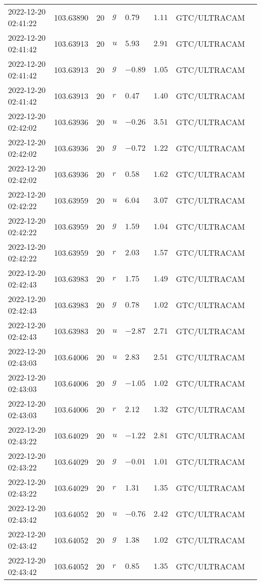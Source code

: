 \documentclass{nature_plusfigure}
\begin{document}
\begin{supplement}
\begin{center}
\begin{longtable}{llllllll}
2022-12-20 02:41:22 & 103.63890 & 20 & $g$ & $0.79$ & $1.11$ & GTC/ULTRACAM &  \\ 
2022-12-20 02:41:42 & 103.63913 & 20 & $u$ & $5.93$ & $2.91$ & GTC/ULTRACAM &  \\ 
2022-12-20 02:41:42 & 103.63913 & 20 & $g$ & $-0.89$ & $1.05$ & GTC/ULTRACAM &  \\ 
2022-12-20 02:41:42 & 103.63913 & 20 & $r$ & $0.47$ & $1.40$ & GTC/ULTRACAM &  \\ 
2022-12-20 02:42:02 & 103.63936 & 20 & $u$ & $-0.26$ & $3.51$ & GTC/ULTRACAM &  \\ 
2022-12-20 02:42:02 & 103.63936 & 20 & $g$ & $-0.72$ & $1.22$ & GTC/ULTRACAM &  \\ 
2022-12-20 02:42:02 & 103.63936 & 20 & $r$ & $0.58$ & $1.62$ & GTC/ULTRACAM &  \\ 
2022-12-20 02:42:22 & 103.63959 & 20 & $u$ & $6.04$ & $3.07$ & GTC/ULTRACAM &  \\ 
2022-12-20 02:42:22 & 103.63959 & 20 & $g$ & $1.59$ & $1.04$ & GTC/ULTRACAM &  \\ 
2022-12-20 02:42:22 & 103.63959 & 20 & $r$ & $2.03$ & $1.57$ & GTC/ULTRACAM &  \\ 
2022-12-20 02:42:43 & 103.63983 & 20 & $r$ & $1.75$ & $1.49$ & GTC/ULTRACAM &  \\ 
2022-12-20 02:42:43 & 103.63983 & 20 & $g$ & $0.78$ & $1.02$ & GTC/ULTRACAM &  \\ 
2022-12-20 02:42:43 & 103.63983 & 20 & $u$ & $-2.87$ & $2.71$ & GTC/ULTRACAM &  \\ 
2022-12-20 02:43:03 & 103.64006 & 20 & $u$ & $2.83$ & $2.51$ & GTC/ULTRACAM &  \\ 
2022-12-20 02:43:03 & 103.64006 & 20 & $g$ & $-1.05$ & $1.02$ & GTC/ULTRACAM &  \\ 
2022-12-20 02:43:03 & 103.64006 & 20 & $r$ & $2.12$ & $1.32$ & GTC/ULTRACAM &  \\ 
2022-12-20 02:43:22 & 103.64029 & 20 & $u$ & $-1.22$ & $2.81$ & GTC/ULTRACAM &  \\ 
2022-12-20 02:43:22 & 103.64029 & 20 & $g$ & $-0.01$ & $1.01$ & GTC/ULTRACAM &  \\ 
2022-12-20 02:43:22 & 103.64029 & 20 & $r$ & $1.31$ & $1.35$ & GTC/ULTRACAM &  \\ 
2022-12-20 02:43:42 & 103.64052 & 20 & $u$ & $-0.76$ & $2.42$ & GTC/ULTRACAM &  \\ 
2022-12-20 02:43:42 & 103.64052 & 20 & $g$ & $1.38$ & $1.02$ & GTC/ULTRACAM &  \\ 
2022-12-20 02:43:42 & 103.64052 & 20 & $r$ & $0.85$ & $1.35$ & GTC/ULTRACAM &  \\ 

\end{longtable}
\end{center}
\end{supplement}
\end{document}
